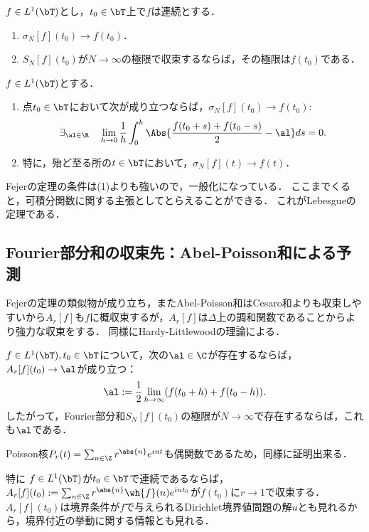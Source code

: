 \documentclass[uplatex,dvipdfmx]{jsreport}
\begin{document}
\begin{corollary}\label{cor-Fejer}
    $f\in L^1(\bT)$とし，$t_0\in\bT$上で$f$は連続とする．
    \begin{enumerate}
        \item $\sigma_N[f](t_0)\to f(t_0)$．
        \item $S_N[f](t_0)$が$N\to\infty$の極限で収束するならば，その極限は$f(t_0)$である．
    \end{enumerate}
\end{corollary}


\begin{theorem}
    $f\in L^1(\bT)$とする．
    \begin{enumerate}
        \item 点$t_0\in\bT$において次が成り立つならば，$\sigma_N[f](t_0)\to f(t_0)$:
        \[\exists_{\al\in\R}\quad\lim_{h\to0}\frac{1}{h}\int^h_0\Abs{\frac{f(t_0+s)+f(t_0-s)}{2}-\al}ds=0.\]
        \item 特に，殆ど至る所の$t\in\bT$において，$\sigma_N[f](t)\to f(t)$．
    \end{enumerate}
\end{theorem}
\begin{remarks}
    Fejerの定理の条件は(1)よりも強いので，一般化になっている．
    ここまでくると，可積分関数に関する主張としてとらえることができる．
    これがLebesgueの定理である．
\end{remarks}

\subsection{Fourier部分和の収束先：Abel-Poisson和による予測}

\begin{tcolorbox}[colframe=ForestGreen, colback=ForestGreen!10!white,breakable,colbacktitle=ForestGreen!40!white,coltitle=black,fonttitle=\bfseries\sffamily,
title=]
    Fejerの定理の類似物が成り立ち，またAbel-Poisson和はCesaro和よりも収束しやすいから$A_r[f]$も$f$に概収束するが，$A_r[f]$は$\Delta$上の調和関数であることからより強力な収束をする．
    同様にHardy-Littlewoodの理論による．
\end{tcolorbox}

\begin{theorem}
    $f\in L^1(\bT),t_0\in\bT$について，次の$\al\in\C$が存在するならば，$A_r[f](t_0)\to\al$が成り立つ：
    \[\al:=\frac{1}{2}\lim_{h\to\infty}(f(t_0+h)+f(t_0-h)).\]
    したがって，Fourier部分和$S_N[f](t_0)$の極限が$N\to\infty$で存在するならば，これも$\al$である．
\end{theorem}
\begin{Proof}
    Poisson核$P_r(t)=\sum_{n\in\Z}r^{\abs{n}}e^{int}$も偶関数であるため，同様に証明出来る．
\end{Proof}
\begin{remarks}
    特に
    $f\in L^1(\bT)$が$t_0\in\bT$で連続であるならば，
    $A_r[f](t_0):=\sum_{n\in\Z}r^{\abs{n}}\wh{f}(n)e^{int_0}$が$f(t_0)$に$r\to1$で収束する．
    $A_r[f](t_0)$は境界条件が$f$で与えられるDirichlet境界値問題の解$u$とも見れるから，境界付近の挙動に関する情報とも見れる．
\end{remarks}
\end{document}
